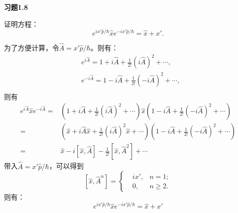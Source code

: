 \documentclass[reqno,a4paper,12pt]{amsart}
\begin{document}
\textbf{习题1.8}

证明方程：
\[
	e^{ix'\hat{p}/\hbar} \hat{x} e^{-ix'\hat{p}/\hbar} = \hat{x} + x'.
\]

\begin{tcolorbox}[breakable, colback = black!5!white, colframe = black]

为了方便计算，令$\hat{A} = x'\hat{p}/\hbar$。则有：
\begin{align*}
	&e^{i\hat{A}} = 1 + i\hat{A} + \frac{1}{2!}(i\hat{A})^2 + \cdots, \\
	&e^{-i\hat{A}} = 1 - i\hat{A} + \frac{1}{2!}(-i\hat{A})^2 + \cdots, \\
\end{align*}
则有
\begin{align*}
	e^{i\hat{A}} \hat{x} e^{-i\hat{A}} =& \left( 1+i\hat{A}+\frac{1}{2!}(i\hat{A})^2 + \cdots \right) \hat{x} \left( 1-i\hat{A}+\frac{1}{2!}(-i\hat{A})^2 + \cdots \right) \\
	=& \left( \hat{x}+i\hat{A}\hat{x} + \frac{1}{2!}(i\hat{A})^2\hat{x} + \cdots \right)\left( 1 - i\hat{A} + \frac{1}{2!}(-i\hat{A})^2 + \cdots \right) \\
	=& \hat{x} - i[\hat{x}, \hat{A}] - \frac{1}{2!}[\hat{x}, \hat{A}^2] + \cdots
\end{align*}
带入$\hat{A} = x'\hat{p}/\hbar$，可以得到
\[
	[\hat{x}, \hat{A}^n] = \left\{
	\begin{aligned}
		&ix', & n=1; \\
		&0, & n \geq 2.
	\end{aligned}\right.
\]
则有：
\[
	e^{ix'\hat{p}/\hbar} \hat{x} e^{-ix'\hat{p}/\hbar} = \hat{x} + x'
\]
\end{tcolorbox}
\end{document}
